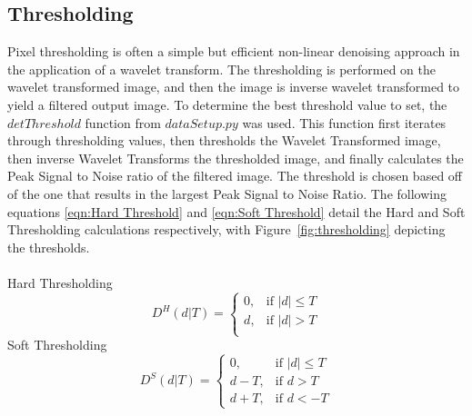 \documentclass{article}
\begin{document}
\subsection{Thresholding}
Pixel thresholding is often a simple but efficient non-linear denoising approach in the application of a wavelet transform. The thresholding is performed on the wavelet transformed image, and then the image is inverse wavelet transformed to yield a filtered output image. To determine the best threshold value to set, the $detThreshold$ function from $dataSetup.py$ was used. This function first iterates through thresholding values, then thresholds the Wavelet Transformed image, then inverse Wavelet Transforms the thresholded image, and finally calculates the Peak Signal to Noise ratio of the filtered image. The threshold is chosen based off of the one that results in the largest Peak Signal to Noise Ratio. The following equations \eqref{eqn:Hard Threshold} and \eqref{eqn:Soft Threshold} detail the Hard and Soft Thresholding calculations respectively, with Figure~\ref{fig:thresholding} depicting the thresholds.
\\\\
Hard Thresholding   
\begin{equation}\label{eqn:Hard Threshold}
D^H(d|T) =
\begin{cases}
0, & \text{if $|d| \leq T$} \\
d, & \text{if $|d| > T$} \\
\end{cases}
\end{equation}	
Soft Thresholding
\begin{equation}\label{eqn:Soft Threshold}
D^S(d|T) =
\begin{cases}
0, & \text{if $|d| \leq T$} \\
d-T, & \text{if $d > T$} \\
d+T, & \text{if $d < -T$}
\end{cases}
\end{equation} 
\end{document}

